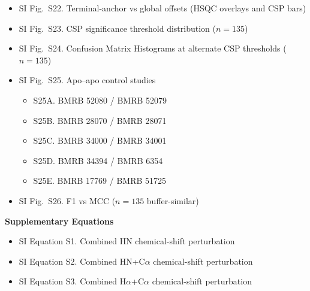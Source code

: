 \documentclass[11pt]{article}
\begin{document}
\begin{itemize}[label={}]
\item SI Fig.\ S22. Terminal-anchor vs global offsets (HSQC overlays and CSP bars)
\item SI Fig.\ S23. CSP significance threshold distribution ($n=135$)
\item SI Fig.\ S24. Confusion Matrix Histograms at alternate CSP thresholds ($n=135$)
\item SI Fig.\ S25. Apo--apo control studies
\begin{itemize}[leftmargin=1.8em,label={},itemsep=0.05em,parsep=0pt,topsep=0.12em]
\item S25A. BMRB 52080 / BMRB 52079
\item S25B. BMRB 28070 / BMRB 28071
\item S25C. BMRB 34000 / BMRB 34001
\item S25D. BMRB 34394 / BMRB 6354
\item S25E. BMRB 17769 / BMRB 51725
\end{itemize}
\item SI Fig.\ S26. F1 vs MCC ($n=135$ buffer-similar)
\end{itemize}

\vspace{0.6em}
\noindent\textbf{Supplementary Equations}\\[0.3em]
\begin{itemize}[label={}]
\item SI Equation S1. Combined HN chemical-shift perturbation
\item SI Equation S2. Combined HN+C$\alpha$ chemical-shift perturbation
\item SI Equation S3. Combined H$\alpha$+C$\alpha$ chemical-shift perturbation
\end{itemize}
\end{document}
